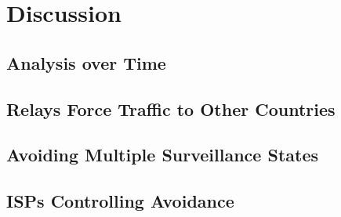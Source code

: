 \section{Discussion}
\label{discussion}

\subsection{Analysis over Time}

\subsection{Relays Force Traffic to Other Countries}

\subsection{Avoiding Multiple Surveillance States}

\subsection{ISPs Controlling Avoidance}
